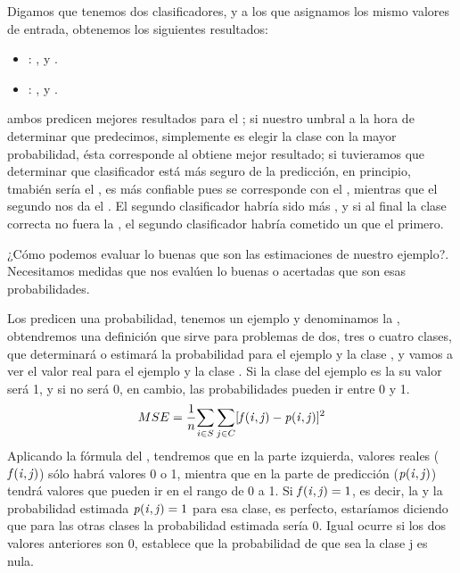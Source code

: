 Digamos que tenemos dos clasificadores,  y  a los que asignamos los mismo valores de entrada, obtenemos los siguientes resultados:
\begin{itemize}
    \item {}: ,  y .
    \item {}: ,  y .
\end{itemize}
ambos predicen mejores resultados para el ; si nuestro umbral a la hora de determinar que predecimos, simplemente es elegir la clase con la mayor probabilidad, ésta corresponde al   obtiene mejor resultado; si tuvieramos que determinar que clasificador está más seguro de la predicción, en principio, tmabién sería el , es más confiable pues se corresponde con el , mientras que el segundo nos da el . El segundo clasificador habría sido más , y si al final la clase correcta no fuera la , el segundo clasificador habría cometido un  que el primero.

¿Cómo podemos evaluar lo buenas que son las estimaciones de nuestro ejemplo?. Necesitamos medidas que nos evalúen lo buenas o acertadas que son esas probabilidades.

Los  predicen una probabilidad, tenemos un ejemplo y denominamos la , obtendremos una definición que sirve para problemas de dos, tres o cuatro clases, que determinará o estimará la probabilidad para el ejemplo  y la clase , y vamos a ver el valor real para el ejemplo  y la clase . Si la clase del ejemplo  es la  su valor será 1, y si no será 0, en cambio, las probabilidades pueden ir entre 0 y 1.
\begin{equation*}
    MSE = \frac{1}{n}\displaystyle{\sum_{i\in S}\sum_{j\in C}[\ensuremath{\mathit{f(i,j)} } - \ensuremath{\mathit{p(i,j)} }]^2}
\end{equation*}
Aplicando la fórmula del , tendremos que en la parte izquierda, valores reales ($\mathit{f(i,j)} $) sólo habrá valores 0 o 1, mientra que en la parte de predicción ($\mathit{p(i,j)} $) tendrá valores que pueden ir en el rango de 0 a 1. Si $\mathit{f(i,j)}  = 1$, es decir, la  y la probabilidad estimada $\mathit{p(i,j)}  = 1$ para esa clase, es perfecto, estaríamos diciendo que para las otras clases la probabilidad estimada sería 0. Igual ocurre si los dos valores anteriores son 0, establece que la probabilidad de que sea la clase j es nula.

